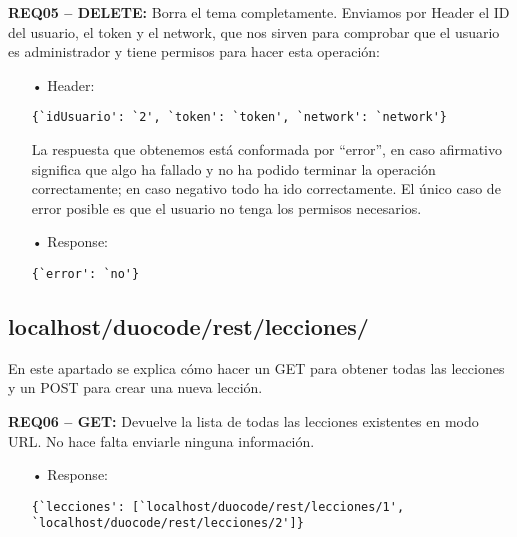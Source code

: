 \textbf{REQ05 – DELETE:} Borra el tema completamente. Enviamos por Header el ID del usuario, el token y el network, que nos sirven para comprobar que el usuario es administrador y tiene permisos para hacer esta operación:
\begin{itemize}
\item[•]Header:
{\codesize
\begin{verbatim}
{`idUsuario': `2', `token': `token', `network': `network'}
\end{verbatim}
}

La respuesta que obtenemos está conformada por ``error'', en caso afirmativo significa que algo ha fallado y no ha podido terminar la operación correctamente; en caso negativo todo ha ido correctamente. El único caso de error posible es que el usuario no tenga los permisos necesarios.
\item[•]Response: 
{\codesize
\begin{verbatim}
{`error': `no'}
\end{verbatim}
}
\end{itemize}

\subsection{localhost/duocode/rest/lecciones/}
En este apartado se explica cómo hacer un GET para obtener todas las lecciones y un POST para crear una nueva lección.

\textbf{REQ06 – GET:} Devuelve la lista de todas las lecciones existentes en modo URL. No hace falta enviarle ninguna información. 
\begin{itemize}
\item[•]Response:
{\codesize
\begin{verbatim}
{`lecciones': [`localhost/duocode/rest/lecciones/1', 
`localhost/duocode/rest/lecciones/2']}
\end{verbatim}
}
\end{itemize}

